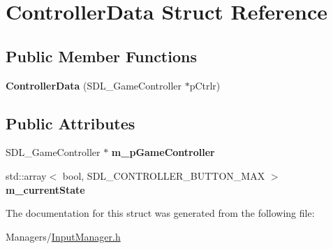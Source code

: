 \hypertarget{structControllerData}{}\section{Controller\+Data Struct Reference}
\label{structControllerData}
\subsection*{Public Member Functions}
\begin{DoxyCompactItemize}
\item 
\mbox{\label{structControllerData_a8e9d22ccf0f1eea02e0c1dff650f124b}} 
{\bfseries Controller\+Data} (S\+D\+L\+\_\+\+Game\+Controller $\ast$p\+Ctrlr)
\end{DoxyCompactItemize}
\subsection*{Public Attributes}
\begin{DoxyCompactItemize}
\item 
\mbox{\label{structControllerData_adb96c2ca9c0cd6febdf488cd037807ff}} 
S\+D\+L\+\_\+\+Game\+Controller $\ast$ {\bfseries m\+\_\+p\+Game\+Controller}
\item 
\mbox{\label{structControllerData_a4c716bf1964596059400741a973dbc42}} 
std\+::array$<$ bool, S\+D\+L\+\_\+\+C\+O\+N\+T\+R\+O\+L\+L\+E\+R\+\_\+\+B\+U\+T\+T\+O\+N\+\_\+\+M\+AX $>$ {\bfseries m\+\_\+current\+State}
\end{DoxyCompactItemize}


The documentation for this struct was generated from the following file\+:\begin{DoxyCompactItemize}
\item 
Managers/\hyperlink{InputManager_8h}{Input\+Manager.\+h}\end{DoxyCompactItemize}
